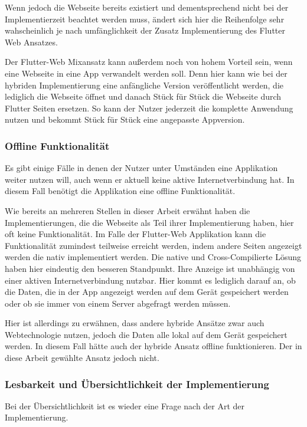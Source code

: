 Wenn jedoch die Webseite bereits existiert und dementsprechend nicht bei der Implementierzeit beachtet werden muss, ändert sich hier die Reihenfolge sehr wahscheinlich je nach umfänglichkeit der Zusatz Implementierung des Flutter Web Ansatzes.

Der Flutter-Web Mixansatz kann außerdem noch von hohem Vorteil sein, wenn eine Webseite in eine App verwandelt werden soll. Denn hier kann wie bei der hybriden Implementierung eine anfängliche Version veröffentlicht werden, die lediglich die Webseite öffnet und danach Stück für Stück die Webseite durch Flutter Seiten ersetzen. So kann der Nutzer jederzeit die komplette Anwendung nutzen und bekommt Stück für Stück eine angepasste Appversion.

\subsubsection{Offline Funktionalität}
Es gibt einige Fälle in denen der Nutzer unter Umständen eine Applikation weiter nutzen will, auch wenn er aktuell keine aktive Internetverbindung hat. In diesem Fall benötigt die Applikation eine offline Funktionalität.

Wie bereits an mehreren Stellen in dieser Arbeit erwähnt haben die Implementierungen, die die Webseite als Teil ihrer Implementierung haben, hier oft keine Funktionalität. Im Falle der Flutter-Web Applikation kann die Funktionalität zumindest teilweise erreicht werden, indem andere Seiten angezeigt werden die nativ implementiert werden. Die native und Cross-Compilierte Lösung haben hier eindeutig den besseren Standpunkt. Ihre Anzeige ist unabhängig von einer aktiven Internetverbindung nutzbar. Hier kommt es lediglich darauf an, ob die Daten, die in der App angezeigt werden auf dem Gerät gespeichert werden oder ob sie immer von einem Server abgefragt werden müssen. 

Hier ist allerdings zu erwähnen, dass andere hybride Ansätze zwar auch Webtechnologie nutzen, jedoch die Daten alle lokal auf dem Gerät gespeichert werden. In diesem Fall hätte auch der hybride Ansatz offline funktionieren. Der in diese Arbeit gewählte Ansatz jedoch nicht.


\subsubsection{Lesbarkeit und Übersichtlichkeit der Implementierung}
Bei der Übersichtlichkeit ist es wieder eine Frage nach der Art der Implementierung. 

